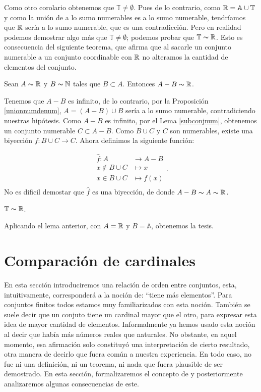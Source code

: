 Como otro corolario  obtenemos que
$\mathbb{T}\neq\emptyset$. Pues de lo contrario, como
$\mathbb{R}=\mathbb{A}\cup\mathbb{T}$ y como la unión de a lo sumo
numerables es a lo sumo numerable, tendríamos que $\mathbb{R}$
sería a lo sumo numerable, que es una contradicción. Pero
en realidad podemos demostrar algo más que
$\mathbb{T}\neq\emptyset$; podemos probar que
$\mathbb{T}\thicksim\mathbb{R}$. Esto es consecuencia del siguiente
teorema, que afirma que al sacarle un conjunto numerable a un
conjunto coordinable con $\mathbb{R}$ no alteramos la cantidad de
elementos del conjunto.
\begin{lema} Sean $A\thicksim\mathbb{R}$ y $B\thicksim\mathbb{N}$ tales que
$B\subset A$. Entonces $A-B\thicksim\mathbb{R}$.
\end{lema}
\begin{demo} Tenemos que $A-B$ es infinito, de lo contrario, por la
Proposición \vref{unionnumdenum}, $A=(A-B)\cup B$ sería a
lo sumo numerable, contradiciendo nuestras hipótesis. Como $A-B$
es infinito, por el Lema \vref{subconjnum}, obtenemos un conjunto
numerable $C\subset A-B$. Como $B\cup C$ y $C$ son numerables,
existe una biyección $f:B\cup C\longrightarrow C$. Ahora
definimos la siguiente función:

\[
  \begin{split}
       \hat{f}:A&\longrightarrow A-B\\
       x\notin B\cup C&\longmapsto x\\
       x\in B\cup C&\longmapsto f(x)\\
  \end{split}.
\]
No es dificil demostar que $\hat{f}$ es una biyección, de donde
$A-B\thicksim A\thicksim\mathbb{R}$.
\end{demo}

\begin{corolario} $\mathbb{T}\thicksim\mathbb{R}$.
\end{corolario}
\begin{demo} Aplicando el lema anterior, con $A=\mathbb{R}$ y
$B=\mathbb{A}$, obtenemos la tesis.
\end{demo}

\section{Comparación de cardinales}
En esta sección introduciremos una relación de orden entre
conjuntos, esta, intuitivamente, corresponderá a la noción de:
``tiene más elementos''. Para conjuntos
finitos todos estamos muy familiarizados con esta noción. También se suele decir que un conjuto
tiene un cardinal mayor que el otro, para expresar esta idea de
mayor cantidad de elementos. Informalmente ya hemos usado esta
noción al decir que había más números reales que
naturales. No obstante, en aquel momento, esa afirmación solo
constituyó una interpretación de cierto resultado, otra manera
de decirlo que fuera común a nuestra experiencia. En todo caso,
no fue ni una definición, ni un teorema, ni nada que fuera
plausible de ser demostrado. En esta sección,  formalizaremos el
concepto de y posteriormente analizaremos
algunas consecuencias de este.

